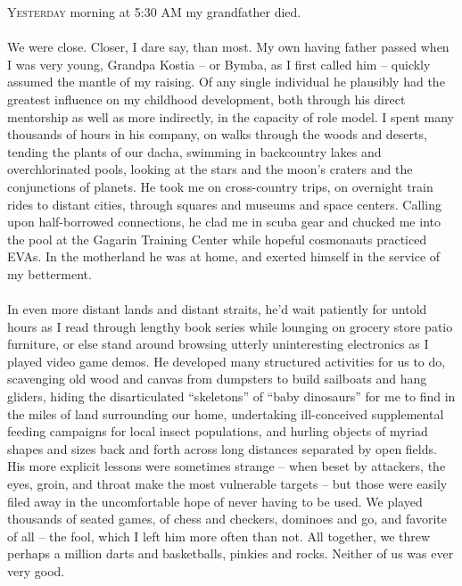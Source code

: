 \documentclass[twoside,twocolumn,openright]{article}
\begin{document}
\lettrine[lines=2]{Y}{esterday} morning at 5:30 AM my grandfather died. 
\\\\
We were close. Closer, I dare say, than most. My own having father passed when I was very young, Grandpa Kostia – or Bymba, as I first called him – quickly assumed the mantle of my raising. Of any single individual he plausibly had the greatest influence on my childhood development, both through his direct mentorship as well as more indirectly, in the capacity of role model. I spent many thousands of hours in his company, on walks through the woods and deserts, tending the plants of our dacha, swimming in backcountry lakes and overchlorinated pools, looking at the stars and the moon’s craters and the conjunctions of planets. He took me on cross-country trips, on overnight train rides to distant cities, through squares and museums and space centers. Calling upon half-borrowed connections, he clad me in scuba gear and chucked me into the pool at the Gagarin Training Center while hopeful cosmonauts practiced EVAs. In the motherland he was at home, and exerted himself in the service of my betterment.
\\\\
In even more distant lands and distant straits, he’d wait patiently for untold hours as I read through lengthy book series while lounging on grocery store patio furniture, or else stand around browsing utterly uninteresting electronics as I played video game demos. He developed many structured activities for us to do, scavenging old wood and canvas from dumpsters to build sailboats and hang gliders, hiding the disarticulated “skeletons” of “baby dinosaurs” for me to find in the miles of land surrounding our home, undertaking ill-conceived supplemental feeding campaigns for local insect populations, and hurling objects of myriad shapes and sizes back and forth across long distances separated by open fields. His more explicit lessons were sometimes strange – when beset by attackers, the eyes, groin, and throat make the most vulnerable targets – but those were easily filed away in the uncomfortable hope of never having to be used. We played thousands of seated games, of chess and checkers, dominoes and go, and favorite of all – the fool, which I left him more often than not. All together, we threw perhaps a million darts and basketballs, pinkies and rocks. Neither of us was ever very good. 
\\\\
\end{document}
